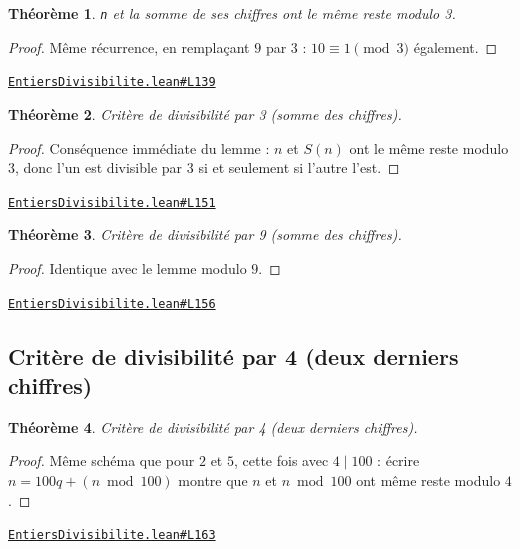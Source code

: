 \documentclass[11pt,a4paper]{article}
\theoremstyle{definition}
\theoremstyle{plain}
\newtheorem{theoreme}{Théorème}
\newcommand{\source}[2]{\par\smallskip\noindent\hfill{\footnotesize\href{#1}{\texttt{#2}}}\par\smallskip}
\begin{document}
\begin{theoreme}
\texttt{n} et la somme de ses chiffres ont le même reste modulo 3.
\end{theoreme}

\begin{proof}
Même récurrence, en remplaçant $9$ par $3$ : $10 \equiv 1 \pmod 3$ également.
\end{proof}
\source{https://github.com/Commutator-IO/learn-lean/blob/main/cours/01-college/01-nombres-et-calculs/EntiersDivisibilite.lean\#L139}{EntiersDivisibilite.lean\#L139}

\begin{theoreme}
Critère de divisibilité par 3 (somme des chiffres).
\end{theoreme}

\begin{proof}
Conséquence immédiate du lemme : $n$ et $S(n)$ ont le même reste modulo $3$, donc l'un
est divisible par $3$ si et seulement si l'autre l'est.
\end{proof}
\source{https://github.com/Commutator-IO/learn-lean/blob/main/cours/01-college/01-nombres-et-calculs/EntiersDivisibilite.lean\#L151}{EntiersDivisibilite.lean\#L151}

\begin{theoreme}
Critère de divisibilité par 9 (somme des chiffres).
\end{theoreme}

\begin{proof}
Identique avec le lemme modulo $9$.
\end{proof}
\source{https://github.com/Commutator-IO/learn-lean/blob/main/cours/01-college/01-nombres-et-calculs/EntiersDivisibilite.lean\#L156}{EntiersDivisibilite.lean\#L156}

\subsection{Critère de divisibilité par 4 (deux derniers chiffres)}

\begin{theoreme}
Critère de divisibilité par 4 (deux derniers chiffres).
\end{theoreme}

\begin{proof}
Même schéma que pour $2$ et $5$, cette fois avec $4 \mid 100$ : écrire
$n = 100q + (n \bmod 100)$ montre que $n$ et $n \bmod 100$ ont même reste modulo $4$.
\end{proof}
\source{https://github.com/Commutator-IO/learn-lean/blob/main/cours/01-college/01-nombres-et-calculs/EntiersDivisibilite.lean\#L163}{EntiersDivisibilite.lean\#L163}
\end{document}

